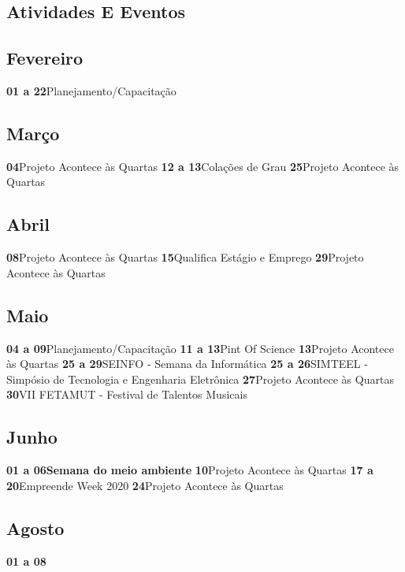 \documentclass[thesis]{hmcposter}
\begin{document}
\begin{poster}
\normalsize \section{\color{hmcorange}Atividades E Eventos}\subsection{Fevereiro}\textbf{01 a 22}\quad \quad Planejamento/Capacitação \newline\subsection{Março}\textbf{04}\quad \quad \quad \quad Projeto Acontece às Quartas \newline\textbf{12 a 13}\quad \quad Colações de Grau \newline\textbf{25}\quad \quad \quad \quad Projeto Acontece às Quartas \newline\subsection{Abril}\textbf{08}\quad \quad \quad \quad Projeto Acontece às Quartas \newline\textbf{15}\quad \quad \quad \quad Qualifica Estágio e Emprego \newline\textbf{29}\quad \quad \quad \quad Projeto Acontece às Quartas \newline\subsection{Maio}\textbf{04 a 09}\quad \quad Planejamento/Capacitação \newline\textbf{11 a 13}\quad \quad Pint Of Science \newline\textbf{13}\quad \quad \quad \quad Projeto Acontece às Quartas \newline\textbf{25 a 29}\quad \quad SEINFO - Semana da Informática \newline\textbf{25 a 26}\quad \quad SIMTEEL - Simpósio de Tecnologia e Engenharia Eletrônica \newline\textbf{27}\quad \quad \quad \quad Projeto Acontece às Quartas \newline\textbf{30}\quad \quad \quad \quad VII FETAMUT - Festival de Talentos Musicais \newline\subsection{Junho}\textbf{01 a 06}\quad \quad \textbf{Semana do meio ambiente} \newline\textbf{10}\quad \quad \quad \quad Projeto Acontece às Quartas \newline\textbf{17 a 20}\quad \quad Empreende Week 2020 \newline\textbf{24}\quad \quad \quad \quad Projeto Acontece às Quartas \newline\subsection{Agosto}\textbf{01 a 08}\quad \quad 
\end{poster}
\end{document}
